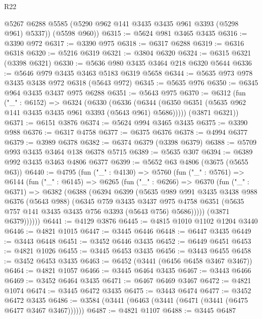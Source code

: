 \begin{lexlean}{R22}
\begin{coremodule}
        @5267
        @6288
        @5585
        (@5290 @962 @141 @3435 @3435 @961 @3393 (@5298 @961) @5337))
      (@5598 @960))
@6315 := @5624 @981 @3465 @3435
@6316 := @3390 @972
@6317 := @3390 @975
@6318 := @6317 @6288
@6319 := @6316 @6318
@6320 := @5216 @6319
@6321 := @3804 @6320
@6324 := @6315 @6321 (@3398 @6321)
@6330 := @5636 @980 @3435 @3464 @218 @6320 @5644
@6336 := @5646 @979 @3435 @3463 @5183 @6319 @5658
@6344 := @5635 @973 @978 @3435 @3438 @972 @6318 (@5643 @972)
@6345 := @5635 @976
@6350 := @6345 @964 @3435 @3437 @975 @6288
@6351 := @5643 @975
@6370 := @6312
    (fun ("_" : @6152) =>
    @6324
      (@6330
        (@6336 (@6344 (@6350 @6351 (@5635 @962 @141 @3435 @3435 @961 @3393 (@5643 @961) @5686)))))
      (@3871 @6321))
@6371 := @6151 @3876
@6374 := @5624 @994 @3465 @3435
@6375 := @3390 @988
@6376 := @6317 @4758
@6377 := @6375 @6376
@6378 := @4994 @6377
@6379 := @3989 @6378
@6382 := @6374 @6379 (@3398 @6379)
@6388 := @5709 @993 @3435 @3464 @138 @6378 @5715
@6389 := @5635 @307
@6394 := @6389 @992 @3435 @3463 @4806 @6377
@6399 := @5652 @63 @4806 (@3675 (@5655 @63))
@6440 := @4795
    (fun ("_" : @4130) =>
    @5760
      (fun ("_" : @5761) =>
      @6144
        (fun ("_" : @6145) =>
        @6265
          (fun ("_" : @6266) =>
          @6370
            (fun ("_" : @6371) =>
            @6382
              (@6388
                (@6394
                  @6399
                  (@5635
                    @989
                    @991
                    @3435
                    @3438
                    @988
                    @6376
                    (@5643 @988)
                    (@6345
                      @759
                      @3435
                      @3437
                      @975
                      @4758
                      @6351
                      (@5635 @757 @141 @3435 @3435 @756 @3393 (@5643 @756) @5686)))))
              (@3871 @6379))))))
@6441 := @4129 @3876
@6445 := @4815 @1010 @1102 @1204 @3440
@6446 := @4821 @1015
@6447 := @3445 @6446
@6448 := @6447 @3435
@6449 := @3443 @6448
@6451 := @3452 @6446 @3435
@6452 := @6449 @6451
@6453 := @4821 @1026
@6455 := @3445 @6453 @3435
@6456 := @3443 @6455
@6458 := @3452 @6453 @3435
@6463 := @6452 (@3441 (@6456 @6458 @3467 @3467))
@6464 := @4821 @1057
@6466 := @3445 @6464 @3435
@6467 := @3443 @6466
@6469 := @3452 @6464 @3435
@6471 := @6467 @6469 @3467
@6472 := @4821 @1074
@6474 := @3445 @6472 @3435
@6475 := @3443 @6474
@6477 := @3452 @6472 @3435
@6486 := @3584 (@3441 (@6463 (@3441 (@6471 (@3441 (@6475 @6477 @3467 @3467))))))
@6487 := @4821 @1107
@6488 := @3445 @6487

\end{coremodule}
\end{lexlean}
